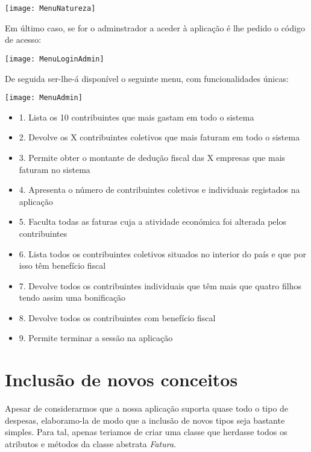 \documentclass[10pt,a4paper]{article}
\begin{document}
\begin{center}
\graphicspath{ {/home/jessica/Desktop/} }
\texttt{[image: MenuNatureza]}\\
\end{center}

Em último caso, se for o adminstrador a aceder à aplicação é lhe pedido o código de acesso: 

\begin{center}
\graphicspath{ {/home/jessica/Desktop/} }
\texttt{[image: MenuLoginAdmin]}\\
\end{center}

De seguida ser-lhe-á disponível o seguinte menu, com funcionalidades únicas:

\begin{center}
\graphicspath{ {/home/jessica/Desktop/} }
\texttt{[image: MenuAdmin]}\\
\end{center}

\begin{itemize}
 \item 1. Lista os 10 contribuintes que mais gastam em todo o sistema
 \item 2. Devolve os X contribuintes coletivos que mais faturam em todo o sistema
 \item 3. Permite obter o montante de dedução fiscal das X empresas que mais faturam no sistema
 \item 4. Apresenta o número de contribuintes coletivos e individuais registados na aplicação
 \item 5. Faculta todas as faturas cuja a atividade económica foi alterada pelos contribuintes
 \item 6. Lista todos os contribuintes coletivos situados no interior do país e que por isso têm benefício fiscal
 \item 7. Devolve todos os contribuintes individuais que têm mais que quatro filhos tendo assim uma bonificação
 \item 8. Devolve todos os contribuintes com benefício fiscal
 \item 9. Permite terminar a sessão na aplicação
\end{itemize}

\cleardoublepage

\section{Inclusão de novos conceitos}
\label{sec:solucao}
Apesar de considerarmos que a nossa aplicação suporta quase todo o tipo de despesas, elaboramo-la de modo que a inclusão de novos tipos seja bastante simples. Para tal, apenas teriamos de criar uma classe que herdasse todos os atributos e métodos da classe abstrata \textit{Fatura}.\\
\end{document}
